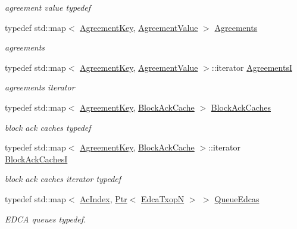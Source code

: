 \begin{DoxyCompactItemize}
\begin{DoxyCompactList}\small\item\em agreement value typedef \end{DoxyCompactList}\item 
typedef std\+::map$<$ \hyperlink{classns3_1_1MacLow_a8d666357756bbc5ea2d1b7fac3a5e938}{Agreement\+Key}, \hyperlink{classns3_1_1MacLow_a68fcd01fab733ead22d9655640258a6a}{Agreement\+Value} $>$ \hyperlink{classns3_1_1MacLow_ad19858356831469ee643891fca0ef6a3}{Agreements}
\begin{DoxyCompactList}\small\item\em agreements \end{DoxyCompactList}\item 
typedef std\+::map$<$ \hyperlink{classns3_1_1MacLow_a8d666357756bbc5ea2d1b7fac3a5e938}{Agreement\+Key}, \hyperlink{classns3_1_1MacLow_a68fcd01fab733ead22d9655640258a6a}{Agreement\+Value} $>$\+::iterator \hyperlink{classns3_1_1MacLow_a7876cc9b328cdb0508f2a7b7647eab10}{AgreementsI}
\begin{DoxyCompactList}\small\item\em agreements iterator \end{DoxyCompactList}\item 
typedef std\+::map$<$ \hyperlink{classns3_1_1MacLow_a8d666357756bbc5ea2d1b7fac3a5e938}{Agreement\+Key}, \hyperlink{classns3_1_1BlockAckCache}{Block\+Ack\+Cache} $>$ \hyperlink{classns3_1_1MacLow_a9e628f9b15e0fd3eaf7b5eeb586ea968}{Block\+Ack\+Caches}
\begin{DoxyCompactList}\small\item\em block ack caches typedef \end{DoxyCompactList}\item 
typedef std\+::map$<$ \hyperlink{classns3_1_1MacLow_a8d666357756bbc5ea2d1b7fac3a5e938}{Agreement\+Key}, \hyperlink{classns3_1_1BlockAckCache}{Block\+Ack\+Cache} $>$\+::iterator \hyperlink{classns3_1_1MacLow_ae0b0abf84b6078031fabd4e85e1cb1bf}{Block\+Ack\+CachesI}
\begin{DoxyCompactList}\small\item\em block ack caches iterator typedef \end{DoxyCompactList}\item 
typedef std\+::map$<$ \hyperlink{group__wifi_gab422b4562ba272b39a9b6bca3513f3ac}{Ac\+Index}, \hyperlink{classns3_1_1Ptr}{Ptr}$<$ \hyperlink{classns3_1_1EdcaTxopN}{Edca\+TxopN} $>$ $>$ \hyperlink{classns3_1_1MacLow_aa79c94ba0439ea9fc9d91dc65f48fd8a}{Queue\+Edcas}
\begin{DoxyCompactList}\small\item\em E\+D\+CA queues typedef. \end{DoxyCompactList}\end{DoxyCompactItemize}
